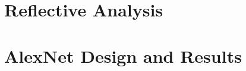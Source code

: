 \documentclass[harvard]{lincolncsthesis}
\begin{document}
\chapter{Reflective Analysis}




\printReferences


\appendix
\chapter{AlexNet Design and Results}

\end{document}
